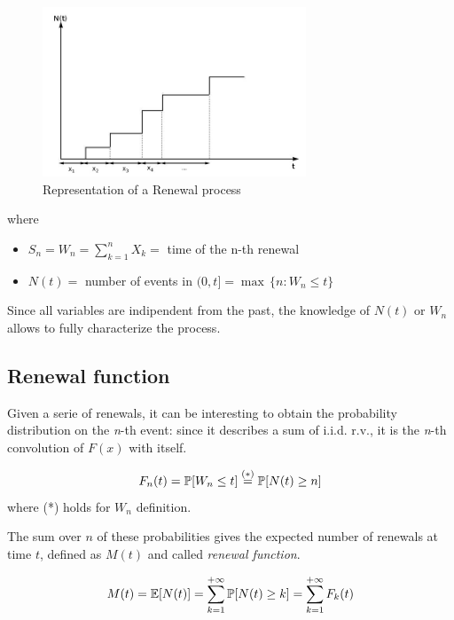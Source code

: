	\begin{figure}
		\centering
		\includegraphics[width=0.7\textwidth]{img/renewal.jpg}
		\caption{Representation of a Renewal process}
	\end{figure}

	where
	\begin{itemize}
		\item $ S_n = W_n = \sum\limits_{k=1}^n X_k =$ time of the n-th renewal
		\item $ N(t) = $ number of events in $(0, t] = \max\,\{n : W_n \le t \}$
	\end{itemize}

	Since all variables are indipendent from the past, the knowledge of $N(t)$ or $W_n$ allows to fully characterize the process.

\subsection{Renewal function}
	Given a serie of renewals, it can be interesting to obtain the probability distribution on the \emph{n}-th event: since it describes a sum of i.i.d. r.v., it is the \emph{n}-th convolution of $F(x)$ with itself.

	\begin{equation}
		F_n(t) = \mathbb{P}[W_n \le t] \stackrel{(*)}{=} \mathbb{P}[N(t) \ge n]
	\end{equation}
	where (*) holds for $W_n$ definition.

		\begin{definition}
			The sum over $n$ of these probabilities gives the expected number of renewals at time $t$, defined as $M(t)$ and called \emph{renewal function}.

			\begin{equation}
				M(t) = \mathbb{E}[N(t)] = \sum\limits_{k=1}^{+\infty}\mathbb{P}[N(t)\ge k] = \sum\limits_{k=1}^{+\infty} F_k(t)
			\end{equation}
		\end{definition}

